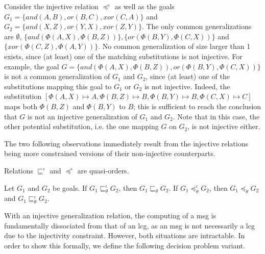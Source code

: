\begin{example}
    Consider the injective relation $\preceq^\iota$ as well as the goals 
    	$G_1 = \{and(A,B), or(B,C), xor(C,A)\}$ and
    	$G_2 = \{and(X,Z), or(Y,X), xor(Z,Y)\}$.
    The only common generalizations are $\emptyset$, $\{and(\Phi(A,X),\Phi(B,Z))\}, \{or(\Phi(B,Y), \Phi(C,X))\}$ and $\{xor(\Phi(C,Z), \Phi(A,Y))\}$. No common generalization of size larger than 1 exists, since (at least) one of the matching substitutions is not injective. For example, the goal $G = \{and(\Phi(A,X), \Phi(B,Z)), or(\Phi(B,Y), \Phi(C,X))\}$ is not a common generalization of $G_1$ and $G_2$, since (at least) one of the substitutions mapping this goal to $G_1$ or $G_2$ is not injective. Indeed, the substitution $[\Phi(A,X) \mapsto A, \Phi(B,Z) \mapsto B, \Phi(B,Y) \mapsto B, \Phi(C,X) \mapsto C]$ maps both $\Phi(B,Z)$ and $\Phi(B,Y)$ to $B$; this is sufficient to reach the conclusion that $G$ is not an injective generalization of $G_1$ and $G_2$. Note that in this case, the other potential substitution, i.e. the one mapping $G$ on $G_2$, is not injective either. 
\end{example}

The two following observations immediately result from the injective relations being more constrained versions of their non-injective counterparts. 

\begin{proposition}
	Relations $\sqsubseteq^\iota$ and $\preceq^\iota$ are quasi-orders. 
\end{proposition}

\begin{proposition}
	Let $G_1$ and $G_2$ be goals. If $G_1\sqsubseteq_\theta^\iota G_2$, then $G_1\sqsubseteq_\theta G_2$. If $G_1\preceq^\iota_\theta G_2$, then $G_1\preceq_\theta G_2$ and $G_1\sqsubseteq^\iota_\theta G_2$.
\end{proposition}

With an injective generalization relation, the computing of a msg is fundamentally dissociated from that of an lcg, as an msg is not necessarily a lcg due to the injectivity constraint. However, both situations are intractable. In order to show this formally, we define the following decision problem variant.

